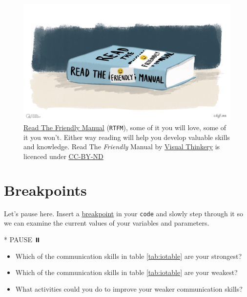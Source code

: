 \documentclass[
]{book}
\newenvironment{Shaded}{\begin{snugshade}}{\end{snugshade}}
\newcommand{\NormalTok}[1]{#1}
\newcommand{\SpecialStringTok}[1]{\textcolor[rgb]{0.31,0.60,0.02}{#1}}
\providecommand{\tightlist}{%
  \setlength{\itemsep}{0pt}\setlength{\parskip}{0pt}}
\begin{document}
\begin{figure}

{\centering \includegraphics[width=1\linewidth]{images/Read the friendly manual} 

}

\caption{\href{https://en.wikipedia.org/wiki/RTFM}{Read The Friendly Manual} (\texttt{RTFM}), some of it you will love, some of it you won't. Either way reading will help you develop valuable skills and knowledge. Read The \emph{Friendly} Manual by \href{https://visualthinkery.com/}{Visual Thinkery} is licenced under \href{https://creativecommons.org/licenses/by-nd/4.0/}{CC-BY-ND}}\label{fig:rtfm-fig}
\end{figure}



\hypertarget{bp4}{%
\section{Breakpoints}\label{bp4}}

Let's pause here. Insert a \href{https://en.wikipedia.org/wiki/Breakpoint}{breakpoint} in your \texttt{code} and slowly step through it so we can examine the current values of your variables and parameters.

\begin{Shaded}
\begin{Highlighting}[]
\SpecialStringTok{* }\NormalTok{PAUSE ⏸️}
\end{Highlighting}
\end{Shaded}

\begin{itemize}
\tightlist
\item
  Which of the communication skills in table \ref{tab:iotable} are your strongest?
\item
  Which of the communication skills in table \ref{tab:iotable} are your weakest?
\item
  What activities could you do to improve your weaker communication skills?
\end{itemize}
\end{document}

